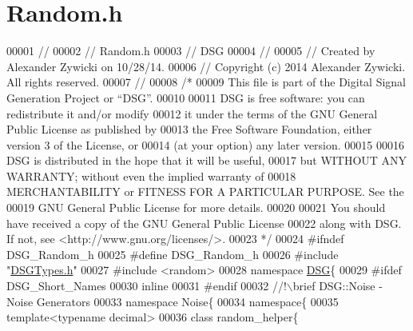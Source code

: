 \hypertarget{_random_8h_source}{\section{Random.\+h}
\label{_random_8h_source}
}

\begin{DoxyCode}
00001 \textcolor{comment}{//}
00002 \textcolor{comment}{//  Random.h}
00003 \textcolor{comment}{//  DSG}
00004 \textcolor{comment}{//}
00005 \textcolor{comment}{//  Created by Alexander Zywicki on 10/28/14.}
00006 \textcolor{comment}{//  Copyright (c) 2014 Alexander Zywicki. All rights reserved.}
00007 \textcolor{comment}{//}
00008 \textcolor{comment}{/*}
00009 \textcolor{comment}{ This file is part of the Digital Signal Generation Project or “DSG”.}
00010 \textcolor{comment}{}
00011 \textcolor{comment}{ DSG is free software: you can redistribute it and/or modify}
00012 \textcolor{comment}{ it under the terms of the GNU General Public License as published by}
00013 \textcolor{comment}{ the Free Software Foundation, either version 3 of the License, or}
00014 \textcolor{comment}{ (at your option) any later version.}
00015 \textcolor{comment}{}
00016 \textcolor{comment}{ DSG is distributed in the hope that it will be useful,}
00017 \textcolor{comment}{ but WITHOUT ANY WARRANTY; without even the implied warranty of}
00018 \textcolor{comment}{ MERCHANTABILITY or FITNESS FOR A PARTICULAR PURPOSE.  See the}
00019 \textcolor{comment}{ GNU General Public License for more details.}
00020 \textcolor{comment}{}
00021 \textcolor{comment}{ You should have received a copy of the GNU General Public License}
00022 \textcolor{comment}{ along with DSG.  If not, see <http://www.gnu.org/licenses/>.}
00023 \textcolor{comment}{ */}
00024 \textcolor{preprocessor}{#ifndef DSG\_Random\_h}
00025 \textcolor{preprocessor}{#define DSG\_Random\_h}
00026 \textcolor{preprocessor}{#include "\hyperlink{_d_s_g_types_8h}{DSGTypes.h}"}
00027 \textcolor{preprocessor}{#include <random>}
00028 \textcolor{keyword}{namespace }\hyperlink{namespace_d_s_g}{DSG}\{
00029 \textcolor{preprocessor}{#ifdef DSG\_Short\_Names}
00030     \textcolor{keyword}{inline}
00031 \textcolor{preprocessor}{#endif}
00032 \textcolor{comment}{    //!\(\backslash\)brief DSG::Noise - Noise Generators}
00033 \textcolor{comment}{}    \textcolor{keyword}{namespace }Noise\{
00034         \textcolor{keyword}{namespace}\{
00035             \textcolor{keyword}{template}<\textcolor{keyword}{typename} decimal>
00036             \textcolor{keyword}{class }random\_helper\{

\end{DoxyCode}
